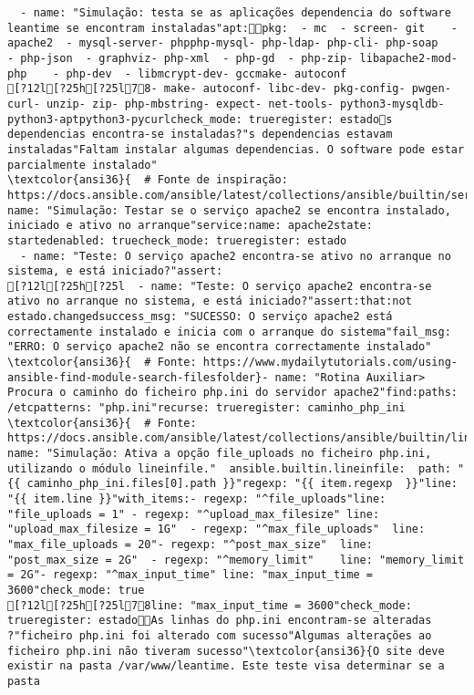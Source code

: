 \documentclass{scrartcl}
\begin{document}
\begin{Verbatim}
  - name: "Simulação: testa se as aplicações dependencia do software leantime se encontram instaladas"apt:pkg:  - mc  - screen- git    - apache2  - mysql-server- phpphp-mysql- php-ldap- php-cli- php-soap    - php-json  - graphviz- php-xml  - php-gd  - php-zip- libapache2-mod-php    - php-dev  - libmcrypt-dev- gccmake- autoconf
[?12l[?25h[?25l78- make- autoconf- libc-dev- pkg-config- pwgen- curl- unzip- zip- php-mbstring- expect- net-tools- python3-mysqldb- python3-aptpython3-pycurlcheck_mode: trueregister: estados dependencias encontra-se instaladas?"s dependencias estavam instaladas"Faltam instalar algumas dependencias. O software pode estar parcialmente instalado"
\textcolor{ansi36}{  # Fonte de inspiração: https://docs.ansible.com/ansible/latest/collections/ansible/builtin/service_module.html}- name: "Simulação: Testar se o serviço apache2 se encontra instalado, iniciado e ativo no arranque"service:name: apache2state: startedenabled: truecheck_mode: trueregister: estado
  - name: "Teste: O serviço apache2 encontra-se ativo no arranque no sistema, e está iniciado?"assert:
[?12l[?25h[?25l  - name: "Teste: O serviço apache2 encontra-se ativo no arranque no sistema, e está iniciado?"assert:that:not estado.changedsuccess_msg: "SUCESSO: O serviço apache2 está correctamente instalado e inicia com o arranque do sistema"fail_msg: "ERRO: O serviço apache2 não se encontra correctamente instalado"
\textcolor{ansi36}{  # Fonte: https://www.mydailytutorials.com/using-ansible-find-module-search-filesfolder}- name: "Rotina Auxiliar> Procura o caminho do ficheiro php.ini do servidor apache2"find:paths: /etcpatterns: "php.ini"recurse: trueregister: caminho_php_ini
\textcolor{ansi36}{  # Fonte: https://docs.ansible.com/ansible/latest/collections/ansible/builtin/lineinfile_module.html}- name: "Simulação: Ativa a opção file_uploads no ficheiro php.ini, utilizando o módulo lineinfile."  ansible.builtin.lineinfile:  path: "{{ caminho_php_ini.files[0].path }}"regexp: "{{ item.regexp  }}"line: "{{ item.line }}"with_items:- regexp: "^file_uploads"line: "file_uploads = 1" - regexp: "^upload_max_filesize" line: "upload_max_filesize = 1G"  - regexp: "^max_file_uploads"  line: "max_file_uploads = 20"- regexp: "^post_max_size"  line: "post_max_size = 2G"  - regexp: "^memory_limit"    line: "memory_limit = 2G"- regexp: "^max_input_time" line: "max_input_time = 3600"check_mode: true
[?12l[?25h[?25l78line: "max_input_time = 3600"check_mode: trueregister: estadoAs linhas do php.ini encontram-se alteradas ?"ficheiro php.ini foi alterado com sucesso"Algumas alterações ao ficheiro php.ini não tiveram sucesso"\textcolor{ansi36}{O site deve existir na pasta /var/www/leantime. Este teste visa determinar se a pasta

\end{Verbatim}
\end{document}
